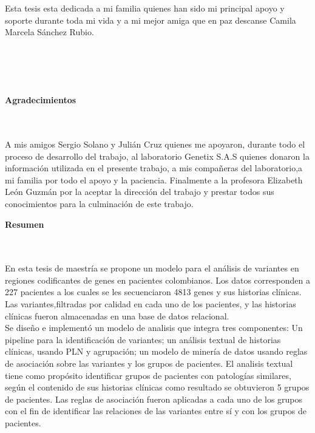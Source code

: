 \begin{flushright}
\begin{minipage}{8cm}
    \noindent
        Esta tesis esta dedicada a mi familia quienes han sido mi principal apoyo y soporte durante toda mi vida y a mi mejor amiga que en paz descanse Camila Marcela Sánchez Rubio.\\[1.0cm]\\
      \end{minipage}
\end{flushright}

\newpage{\pagestyle{empty}\cleardoublepage}

\newpage
\thispagestyle{empty} \textbf{}\normalsize
\\\\\\%
\textbf{\LARGE Agradecimientos}
\\\\
A mis amigos Sergio Solano y Julián Cruz quienes me apoyaron, durante todo el proceso de desarrollo del trabajo, al laboratorio Genetix S.A.S quienes donaron la información utilizada en el presente trabajo, a mis compañeras del laboratorio,a mi familia por todo el apoyo y la paciencia. Finalmente a la profesora Elizabeth León Guzmán por la aceptar la dirección del trabajo y prestar todos sus conocimientos para la culminación de este trabajo. \\

\newpage{\pagestyle{empty}\cleardoublepage}

\newpage
\textbf{\LARGE Resumen}
\\\\
En esta tesis de maestría se propone un modelo para el análisis de variantes en regiones codificantes de genes en pacientes colombianos. Los datos corresponden a 227 pacientes a los cuales se les secuenciaron 4813 genes y sus historias clínicas. Las variantes,filtradas por calidad en cada uno de los pacientes, y las historias clínicas fueron almacenadas en una base de datos relacional.\\

Se diseño e implementó un modelo de analisis que integra tres componentes: Un pipeline para la identificación de variantes; un análisis textual de historias clínicas, usando PLN y agrupación; un modelo de minería de datos usando reglas de asociación sobre las variantes y los grupos de pacientes. El analisis textual tiene como propósito identificar grupos de pacientes con patologías similares, según el contenido de sus historias clínicas como resultado se obtuvieron 5 grupos de pacientes. Las reglas de asociación fueron aplicadas a cada uno de los grupos con el fin de identificar las relaciones de las variantes entre sí y con los grupos de pacientes.  \\

